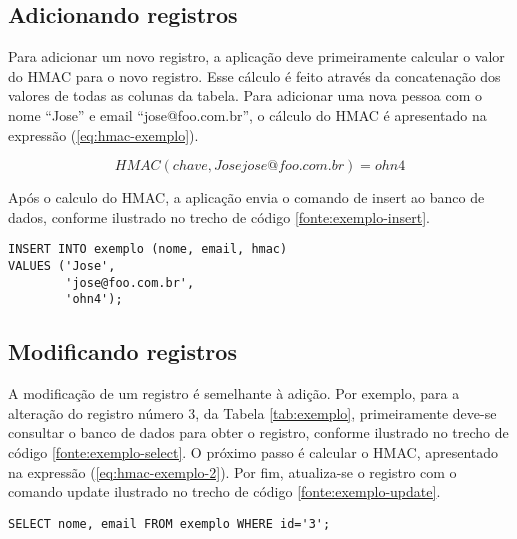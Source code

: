 \subsection{Adicionando registros}

Para adicionar um novo registro, a aplicação deve primeiramente calcular o valor do \ac{HMAC} para o novo registro. Esse cálculo é feito através da concatenação dos valores de todas as colunas da tabela.
Para adicionar uma nova pessoa com o nome ``Jose'' e email ``jose@foo.com.br'', o cálculo do \ac{HMAC} é apresentado na expressão (\ref{eq:hmac-exemplo}).

\begin{equation} \label{eq:hmac-exemplo}
    HMAC(chave, Josejose@foo.com.br) = ohn4
\end{equation}

Ap\'{o}s o calculo do \ac{HMAC}, a aplica\c{c}\~{a}o envia o comando de insert ao banco de dados, conforme ilustrado no trecho de código \ref{fonte:exemplo-insert}.

\lstset{language=SQL,
	basicstyle=\small,
        breaklines=true,
        numbersep=5pt,
        xleftmargin=.35in,
        xrightmargin=.35in}
\begin{center}
\begin{lstlisting}[label=fonte:exemplo-insert, caption=Código SQL para inserir um registro com HMAC]
INSERT INTO exemplo (nome, email, hmac)
VALUES ('Jose',
        'jose@foo.com.br',
        'ohn4');
\end{lstlisting}
\end{center}

\subsection{Modificando registros}

A modificação de um registro é semelhante à adição. Por exemplo, para a alteração do registro número 3, da Tabela \ref{tab:exemplo},
primeiramente deve-se consultar o banco de dados para obter o registro, conforme ilustrado no trecho de código \ref{fonte:exemplo-select}.
O pr\'{o}ximo passo \'{e} calcular o \ac{HMAC}, apresentado na express\~{a}o (\ref{eq:hmac-exemplo-2}).
Por fim, atualiza-se o registro com o comando update ilustrado no trecho de código \ref{fonte:exemplo-update}.

\lstset{language=SQL,
	basicstyle=\small,
        breaklines=true,
        numbersep=5pt,
        xleftmargin=.35in,
        xrightmargin=.35in}
\begin{center}
\begin{lstlisting}[label=fonte:exemplo-select, caption=Código SQL para selecionar um registro]
    SELECT nome, email FROM exemplo WHERE id='3';
\end{lstlisting}
\end{center}

